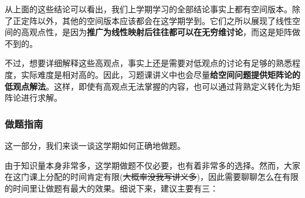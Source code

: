 \documentclass[a4paper,UTF8,fontset=windows,AutoFakeBold]{ctexart}
\begin{document}
从上面的这些结论可以看出，我们上学期学习的全部结论事实上都有空间版本。除了正定阵以外，其他的空间版本应该都会在这学期学到。它们之所以展现了线性空间的高观点性，是因为\textbf{推广为线性映射后往往都可以在无穷维讨论}，而这是矩阵做不到的。

不过，想要详细解释这些高观点，事实上还是需要对低观点的讨论有足够的熟悉程度，实际难度是相对高的。因此，习题课讲义中也会尽量\textbf{给空间问题提供矩阵论的低观点解法}。这样，即使有高观点无法掌握的内容，也可以通过背熟定义转化为矩阵论进行求解。

\subsubsection{做题指南}
这一部分，我们来谈一谈这学期如何正确地做题。

由于知识量本身非常多，这学期做题不仅必要，也有着非常多的选择。然而，大家在这门课上分配的时间肯定有限(\sout{大概率没我写讲义多})，因此需要聊聊怎么在有限的时间里让做题有最大的效果。细说下来，建议主要有三：
\end{document}
